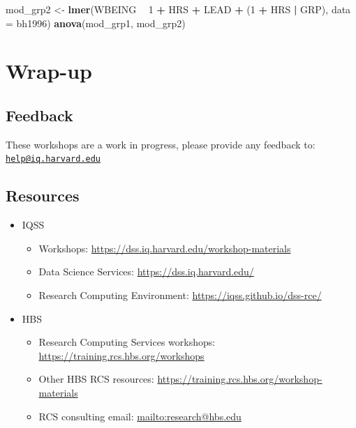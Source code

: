 \documentclass[]{book}
\newenvironment{Shaded}{\begin{snugshade}}{\end{snugshade}}
\newcommand{\DataTypeTok}[1]{\textcolor[rgb]{0.13,0.29,0.53}{#1}}
\newcommand{\DecValTok}[1]{\textcolor[rgb]{0.00,0.00,0.81}{#1}}
\newcommand{\KeywordTok}[1]{\textcolor[rgb]{0.13,0.29,0.53}{\textbf{#1}}}
\newcommand{\NormalTok}[1]{#1}
\newcommand{\OperatorTok}[1]{\textcolor[rgb]{0.81,0.36,0.00}{\textbf{#1}}}
\newcommand{\StringTok}[1]{\textcolor[rgb]{0.31,0.60,0.02}{#1}}
\providecommand{\tightlist}{%
  \setlength{\itemsep}{0pt}\setlength{\parskip}{0pt}}
\begin{document}
\begin{Shaded}
\begin{Highlighting}[]
\NormalTok{  mod_grp2 <-}\StringTok{ }\KeywordTok{lmer}\NormalTok{(WBEING }\OperatorTok{~}\StringTok{ }\DecValTok{1} \OperatorTok{+}\StringTok{ }\NormalTok{HRS }\OperatorTok{+}\StringTok{ }\NormalTok{LEAD }\OperatorTok{+}\StringTok{ }\NormalTok{(}\DecValTok{1} \OperatorTok{+}\StringTok{ }\NormalTok{HRS }\OperatorTok{|}\StringTok{ }\NormalTok{GRP), }\DataTypeTok{data =}\NormalTok{ bh1996)}
  \KeywordTok{anova}\NormalTok{(mod_grp1, mod_grp2)}
\end{Highlighting}
\end{Shaded}

\hypertarget{wrap-up-2}{%
\section{Wrap-up}\label{wrap-up-2}}

\hypertarget{feedback-2}{%
\subsection{Feedback}\label{feedback-2}}

These workshops are a work in progress, please provide any feedback to: \href{mailto:help@iq.harvard.edu}{\nolinkurl{help@iq.harvard.edu}}

\hypertarget{resources-3}{%
\subsection{Resources}\label{resources-3}}

\begin{itemize}
\tightlist
\item
  IQSS

  \begin{itemize}
  \tightlist
  \item
    Workshops: \url{https://dss.iq.harvard.edu/workshop-materials}
  \item
    Data Science Services: \url{https://dss.iq.harvard.edu/}
  \item
    Research Computing Environment: \url{https://iqss.github.io/dss-rce/}
  \end{itemize}
\item
  HBS

  \begin{itemize}
  \tightlist
  \item
    Research Computing Services workshops: \url{https://training.rcs.hbs.org/workshops}
  \item
    Other HBS RCS resources: \url{https://training.rcs.hbs.org/workshop-materials}
  \item
    RCS consulting email: \url{mailto:research@hbs.edu}
  \end{itemize}
\end{itemize}
\end{document}
